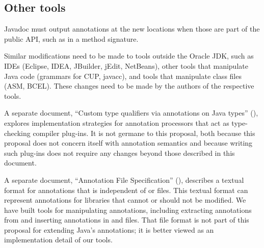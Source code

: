 \documentclass[10pt]{article}
\begin{document}
\subsection{Other tools\label{other-tools}}

Javadoc must output annotations at the new locations when those are part
of the public API, such as in a
method signature.


Similar modifications need to be made to tools outside the Oracle JDK,
such as IDEs (Eclipse, IDEA, JBuilder, jEdit, NetBeans), other tools that
manipulate Java code (grammars for CUP, javacc), and tools that
manipulate class files (ASM, BCEL\@).  These changes need to be made by the
authors of the respective tools.


A separate document, ``Custom type qualifiers via annotations on Java
types'' (),
explores implementation strategies for annotation processors that act as type-checking
compiler plug-ins.  It is not germane to this proposal, both because this proposal
does not concern itself with annotation semantics and because writing such
plug-ins does not require any changes beyond those described in this document.


A separate document, ``Annotation File Specification''
(), describes a
textual format for annotations that is independent of  or
 files.  This textual format can represent annotations for
libraries that cannot or should not be modified.  We have built
tools for manipulating annotations, including extracting
annotations from and inserting annotations in  and
 files.
That file format is not part of this proposal for
extending Java's annotations; it is better viewed as an implementation
detail of our tools.
\end{document}
